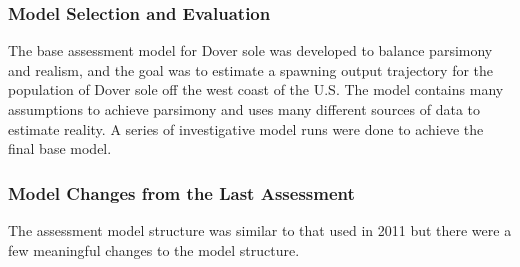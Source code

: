 \documentclass[11pt,
  english,
  a4paper,
]{article}
\begin{document}
\leavevmode\tagmcend\tagstructend\par


\hypertarget{model-selection-and-evaluation}{%
\subsubsection{Model Selection and Evaluation}\label{model-selection-and-evaluation}}

\leavevmode\tagmcend\tagstructend


The base assessment model for Dover sole was developed to balance parsimony and realism, and the goal was to estimate a spawning output trajectory for the population of Dover sole off the west coast of the U.S. The model contains many assumptions to achieve parsimony and uses many different sources of data to estimate reality. A series of investigative model runs were done to achieve the final base model.

\leavevmode\tagmcend\tagstructend\par


\hypertarget{model-changes-from-the-last-assessment}{%
\subsubsection{Model Changes from the Last Assessment}\label{model-changes-from-the-last-assessment}}

\leavevmode\tagmcend\tagstructend


The assessment model structure was similar to that used in 2011 but there were a few meaningful changes to the model structure.

\leavevmode\tagmcend\tagstructend\par

\end{document}

